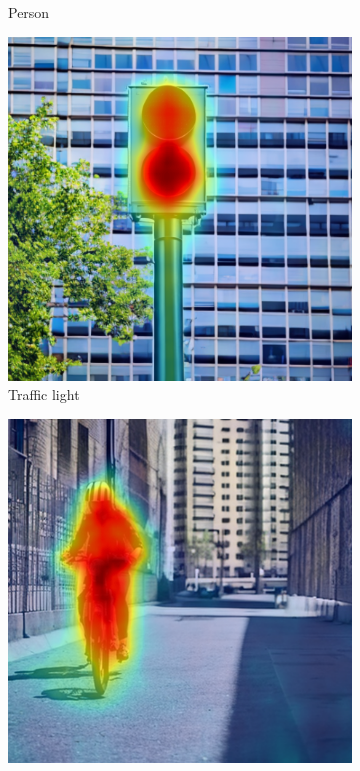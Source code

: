 \begin{figure}
\begin{subfigure}{0.24\columnwidth}
   \caption{Person}
   \label{subfig:dataset-example-person-daam-optimized}
  \end{subfigure}
  \begin{subfigure}{0.24\columnwidth}
   \includegraphics[width=\columnwidth]{img/4-experiments/dataset_example_daam_heatmap_traffic light-full-optimized.png}
   \caption{Traffic light}
   \label{subfig:dataset-example-traffic-daam-optimized}
  \end{subfigure}
  \begin{subfigure}{0.24\columnwidth}
   \includegraphics[width=\columnwidth]{img/4-experiments/dataset_example_daam_heatmap_rider-full-optimized.png}

\end{subfigure}
\end{figure}
